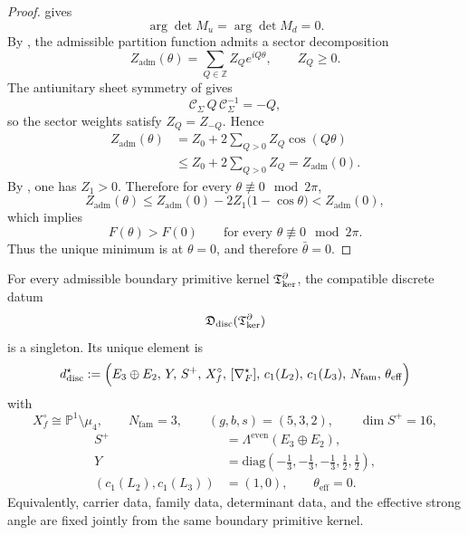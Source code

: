 \begin{proof}
 gives
\[
\arg\det M_u=\arg\det M_d=0.
\]
By , the admissible partition function admits a sector
decomposition
\[
Z_{\mathrm{adm}}(\theta)=\sum_{Q\in\mathbb Z} Z_Q e^{iQ\theta},
\qquad
Z_Q\ge 0.
\]
The antiunitary sheet symmetry of  gives
\[
\mathcal C_\Sigma\,Q\,\mathcal C_\Sigma^{-1}=-Q,
\]
so the sector weights satisfy $Z_Q=Z_{-Q}$. Hence
\[
\begin{aligned}
Z_{\mathrm{adm}}(\theta)
&=Z_0+2\sum_{Q>0}Z_Q\cos(Q\theta)\\
&\le Z_0+2\sum_{Q>0}Z_Q
=Z_{\mathrm{adm}}(0).
\end{aligned}
\]
By , one has $Z_1>0$. Therefore for every
$\theta\not\equiv 0\mod 2\pi$,
\[
Z_{\mathrm{adm}}(\theta)
\le
Z_{\mathrm{adm}}(0)-2Z_1\bigl(1-\cos\theta\bigr)
<
Z_{\mathrm{adm}}(0),
\]
which implies
\[
F(\theta)>F(0)
\qquad
\text{for every }\theta\not\equiv 0\mod 2\pi.
\]
Thus the unique minimum is at $\theta=0$, and therefore $\bar\theta=0$.
\end{proof}

\begin{theorem}
\label{thm:joint-discrete-admissible-sector}
\label{thm:discrete-sector-from-primitive-kernel}
For every admissible boundary primitive kernel $\mathfrak T_{\mathrm{ker}}^\partial$, the compatible discrete datum
\[
\mathfrak D_{\mathrm{disc}}(\mathfrak T_{\mathrm{ker}}^\partial)
\]
is a singleton. Its unique element is
\[
d^\star_{\mathrm{disc}}
:=
\Bigl(
E_3\oplus E_2,\,
Y,\,
S^+,\,
X_f^\circ,\,
[\nabla_F^\star],\,
c_1(L_2),\,
c_1(L_3),\,
N_{\mathrm{fam}},\,
\theta_{\mathrm{eff}}
\Bigr)
\]
with
\[
X_f^\circ\cong\mathbb P^1\setminus\mu_4,
\qquad
N_{\mathrm{fam}}=3,
\qquad
(g,b,s)=(5,3,2),
\qquad
\dim S^+=16,
\]
\[
\begin{aligned}
S^+&=\Lambda^{\mathrm{even}}(E_3\oplus E_2),\\
Y&=\mathrm{diag}\!\left(-\tfrac13,-\tfrac13,-\tfrac13,\tfrac12,\tfrac12\right),\\
(c_1(L_2),c_1(L_3))&=(1,0),\qquad
\theta_{\mathrm{eff}}=0.
\end{aligned}
\]
Equivalently, carrier data, family data, determinant data, and the effective strong angle are fixed
jointly from the same boundary primitive kernel.
\end{theorem}

